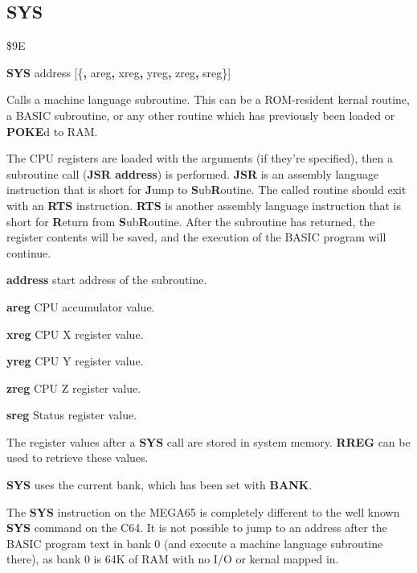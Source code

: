 
\newpage
\subsection{SYS}
\begin{description}[leftmargin=2cm,style=nextline]
\item [Token:] \$9E
\item [Format:] {\bf SYS} address [\{{\bf,} areg{\bf,} xreg{\bf,} yreg{\bf,}
		zreg{\bf,} sreg\}]
\item [Usage:]  Calls a machine language subroutine.
                This can be a ROM-resident kernal routine, a BASIC subroutine,
                or any other routine which has previously been loaded or {\bf POKE}d
                to RAM.

               The CPU registers are loaded with the arguments
               (if they're specified), then a subroutine call ({\bf JSR address})
               is performed. {\bf JSR} is an assembly language instruction that is short
               for {\bf J}ump to {\bf S}ub{\bf R}outine. The called routine should exit with
               an {\bf RTS} instruction. {\bf RTS} is another assembly language instruction that is
               short for {\bf R}eturn from {\bf S}ub{\bf R}outine. After the subroutine has returned,
               the register contents will be saved, and the execution of the BASIC program will
               continue.

               {\bf address} start address of the subroutine.

               {\bf areg} CPU accumulator value.

               {\bf xreg} CPU X register value.

               {\bf yreg} CPU Y register value.

               {\bf zreg} CPU Z register value.

               {\bf sreg} Status register value.

\item [Remarks:] The register values after a {\bf SYS} call are stored
                 in system memory. {\bf RREG} can be used to retrieve these values.

                 {\bf SYS} uses the current bank, which has been set with {\bf BANK}.

                 The {\bf SYS} instruction on the MEGA65 is completely different to the
                 well known {\bf SYS} command on the C64. It is not possible to jump
                 to an address after the BASIC program text in bank 0 (and execute
                 a machine language subroutine there), as bank 0 is 64K of
                 RAM with no I/O or kernal mapped in.


\end{description}
